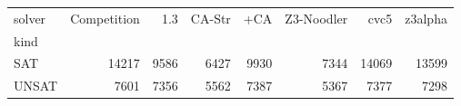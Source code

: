 \begin{tabular}{lrrrrrrr}
\toprule
solver & Competition & \Ostrich{} 1.3 & CA-Str & \Ostrich{}+CA & Z3-Noodler & cvc5 & z3alpha \\
kind &  &  &  &  &  &  &  \\
\midrule
SAT & 14217 & 9586 & 6427 & 9930 & 7344 & 14069 & 13599 \\
UNSAT & 7601 & 7356 & 5562 & 7387 & 5367 & 7377 & 7298 \\
\bottomrule
\end{tabular}
